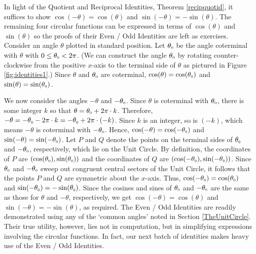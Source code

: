 \smallskip

In light of the Quotient and Reciprocal Identities, Theorem \ref{recipquotid}, it suffices to show $\cos(-\theta) = \cos(\theta)$ and $\sin(-\theta) = -\sin(\theta)$.  The remaining four circular functions can be expressed in terms of $\cos(\theta)$ and $\sin(\theta)$ so the proofs of their Even / Odd Identities are left as exercises.  Consider an angle $\theta$ plotted in standard position. Let $\theta_{\mbox{\tiny $0$}}$ be the angle coterminal with $\theta$ with $0 \leq \theta_{\mbox{\tiny $0$}} < 2\pi$.  (We can construct the angle $\theta_{\mbox{\tiny $0$}}$ by rotating counter-clockwise from the positive $x$-axis to the terminal side of $\theta$ as pictured in Figure \ref{fig:identities1}.)  Since $\theta$ and $\theta_{\mbox{\tiny $0$}}$ are coterminal, $\cos(\theta) = \cos(\theta_{\mbox{\tiny $0$}})$ and $\sin(\theta) = \sin(\theta_{\mbox{\tiny $0$}})$.



We now consider the angles $-\theta$ and $-\theta_{\mbox{\tiny $0$}}$.  Since  $\theta$ is coterminal with $\theta_{\mbox{\tiny $0$}}$, there is some integer $k$ so that $\theta = \theta_{\mbox{\tiny $0$}} + 2\pi \cdot k$.  Therefore, $-\theta =   -\theta_{\mbox{\tiny $0$}} - 2\pi \cdot k = -\theta_{\mbox{\tiny $0$}} + 2\pi \cdot(-k)$.  Since $k$ is an integer, so is $(-k)$, which means $-\theta$ is coterminal with $-\theta_{\mbox{\tiny $0$}}$.  Hence,  $\cos(-\theta) = \cos(-\theta_{\mbox{\tiny $0$}})$ and $\sin(-\theta) = \sin(-\theta_{\mbox{\tiny $0$}})$.  Let $P$ and $Q$ denote the points on the terminal sides of $\theta_{\mbox{\tiny $0$}}$ and $-\theta_{\mbox{\tiny $0$}}$, respectively, which lie on the Unit Circle. By definition, the coordinates of $P$ are $(\cos(\theta_{\mbox{\tiny $0$}}),\sin(\theta_{\mbox{\tiny $0$}}))$ and the coordinates of $Q$ are $(\cos(-\theta_{\mbox{\tiny $0$}}),\sin(-\theta_{\mbox{\tiny $0$}}))$.  Since $\theta_{\mbox{\tiny $0$}}$ and $-\theta_{\mbox{\tiny $0$}}$ sweep out congruent central sectors of the Unit Circle, it follows that the points $P$ and $Q$ are symmetric about the $x$-axis.  Thus, $\cos(-\theta_{\mbox{\tiny $0$}}) = \cos(\theta_{\mbox{\tiny $0$}})$ and $\sin(-\theta_{\mbox{\tiny $0$}}) = -\sin(\theta_{\mbox{\tiny $0$}})$. Since the cosines and sines of $\theta_{\mbox{\tiny $0$}}$ and $-\theta_{\mbox{\tiny $0$}}$ are the same as those for $\theta$ and $-\theta$, respectively, we get $\cos(-\theta) = \cos(\theta)$ and $\sin(-\theta) = -\sin(\theta)$, as required. The Even / Odd Identities are readily demonstrated using any of the `common angles' noted in Section \ref{TheUnitCircle}.  Their true utility, however, lies not in computation, but in simplifying expressions involving the circular functions.  In fact, our next batch of identities makes heavy use of the Even / Odd Identities.


